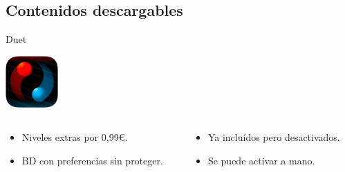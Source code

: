 \subsection{Contenidos descargables}
\begin{frame}{Duet}
\begin{center}\includegraphics[width=0.15\textwidth,keepaspectratio]{imgs/duet_logo.png}\end{center}

\begin{columns}
    \begin{column}{0.5\textwidth}
    \begin{itemize}
        \item<2-> Niveles extras por 0,99€.
        \item<4-> BD con preferencias sin proteger.
    \end{itemize}
    \end{column}

    \begin{column}{0.5\textwidth}
    \begin{itemize}
        \item<3-> Ya incluídos pero desactivados.
        \item<5-> Se puede activar a mano.
    \end{itemize}
    \end{column}
\end{columns}


\end{frame}

